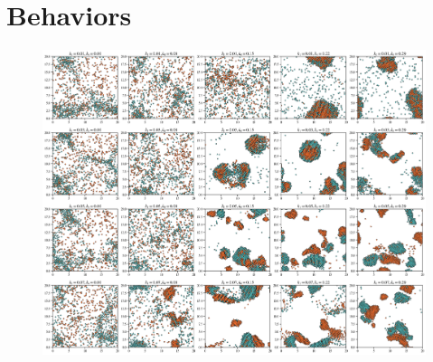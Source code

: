 \documentclass{article}
\begin{document}
\section{Behaviors}
\begin{figure}[H]
    \centering
    \includegraphics[width=\textwidth]{figs/bigGraphParticle_k23_0.5.png}
\end{figure}
\end{document}
